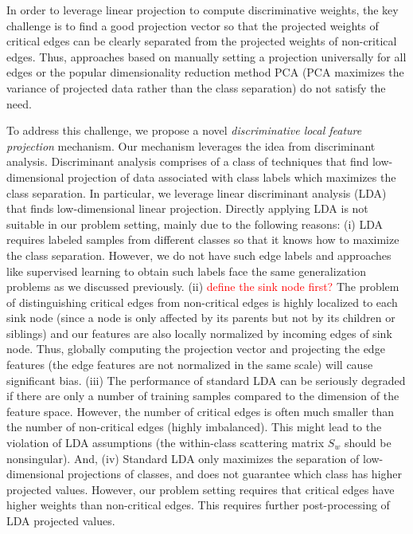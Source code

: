 In order to leverage linear projection to compute discriminative weights, the key challenge is to find a good projection vector so that the projected weights of critical edges can be clearly separated from the projected weights of non-critical edges. 
Thus, approaches based on manually setting a projection universally for all edges or the popular dimensionality reduction method PCA (PCA maximizes the variance of projected data rather than the class separation) do not satisfy the need.

To address this challenge, we propose a novel \emph{discriminative local feature projection} mechanism. Our mechanism leverages the idea from discriminant analysis. Discriminant analysis comprises of a class of techniques that find low-dimensional projection of data associated with class labels which maximizes the class separation. In particular, we leverage linear discriminant analysis (LDA) that finds low-dimensional linear projection. Directly applying LDA is not suitable in our problem setting, mainly due to the following reasons:
(i) LDA requires labeled samples from different classes so that it knows how to maximize the class separation. However, we do not have such edge labels and approaches like supervised learning to obtain such labels face the same generalization problems as we discussed previously.
(ii) \textcolor{red}{define the sink node first?} The problem of distinguishing critical edges from non-critical edges is highly localized to each sink node (since a node is only affected by its parents but not by its children or siblings) and our features are also locally normalized by incoming edges of sink node. Thus, globally computing the projection vector and projecting the edge features (the edge features are not normalized in the same scale) will cause significant bias.
(iii) The performance of standard LDA can be seriously degraded if there are only a number of training samples compared to the dimension of the feature space. However, the number of critical edges is often much smaller than the number of non-critical edges (\ie highly imbalanced). This might lead to the violation of LDA assumptions (\eg the within-class scattering matrix $S_w$ should be nonsingular). And, 
(iv) Standard LDA only maximizes the separation of low-dimensional projections of classes, and does not guarantee which class has higher projected values. However, our problem setting requires that critical edges have higher weights than non-critical edges. This requires further post-processing of LDA projected values.

